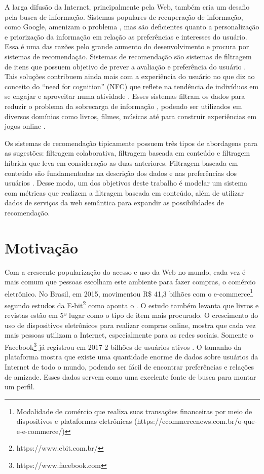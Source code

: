 A larga difusão da Internet, principalmente pela Web, também cria um desafio pela busca de informação. Sistemas populares de recuperação de informação, como Google, amenizam o problema \citep{ISINKAYE2015261}, mas são deficientes quanto a personalização e priorização da informação em relação as preferências e interesses do usuário. Essa é uma das razões pelo grande aumento do desenvolvimento e procura por sistemas de recomendação. Sistemas de recomendação são sistemas de filtragem de itens que possuem objetivo de prever a avaliação e preferência do usuário \citep{Ricci2011}. Tais soluções contribuem ainda mais com a experiência do usuário no que diz ao conceito do “need for cognition” (NFC) que reflete na tendência de indivíduos em se engajar e aproveitar numa atividade \citep{Mykolas:2015a}. Esses sistemas filtram os dados para reduzir o problema da sobrecarga de informação \citep{Konstan2012}, podendo ser utilizados em diversos domínios como livros, filmes, músicas até para construir experiências em jogos online \citep{Activision:Glixel}.

Os sistemas de recomendação tipicamente possuem três tipos de abordagens para as sugestões: filtragem colaborativa, filtragem baseada em conteúdo e filtragem híbrida que leva em consideração as duas anteriores. Filtragem baseada em conteúdo são fundamentadas na descrição dos dados e nas preferências dos usuários \citep{Aggarwal2016}. Desse modo, um dos objetivos deste trabalho é modelar um sistema com métricas que realizem a filtragem baseada em conteúdo, além de utilizar dados de serviços da web semântica para expandir as possibilidades de recomendação.

\section{Motivação}
Com a crescente popularização do acesso e uso da Web no mundo, cada vez é mais comum que pessoas escolham este ambiente para fazer compras, o comércio eletrônico. No Brasil, em 2015, movimentou R\$ 41,3 bilhões com o e-commerce\footnote{Modalidade de comércio que realiza suas transações financeiras por meio de dispositivos e plataformas eletrônicas (https://ecommercenews.com.br/o-que-e-e-commerce/)} segundo estudos da E-bit\footnote{https://www.ebit.com.br/} como aponta o \cite{Sebrae:2016}. O estudo também levanta que livros e revistas estão em 5º lugar como o tipo de item mais procurado. O crescimento do uso de dispositivos eletrônicos para realizar compras online, mostra que cada vez mais pessoas utilizam a Internet, especialmente para as redes sociais. Somente o Facebook\footnote{https://www.facebook.com} já registrou em 2017 2 bilhões de usuários ativos \citep{Statista:2017}. O tamanho da plataforma mostra que existe uma quantidade enorme de dados sobre usuários da Internet de todo o mundo, podendo ser fácil de encontrar preferências e relações de amizade. Esses dados servem como uma excelente fonte de busca para montar um perfil.

